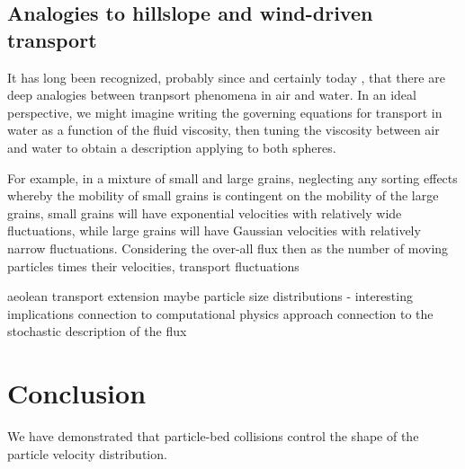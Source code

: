\subsection{Analogies to hillslope and wind-driven transport}

It has long been recognized, probably since \citet{Bagnold1941} and certainly today \citep{}, that there are deep analogies between tranpsort phenomena in air and water.
In an ideal perspective, we might imagine writing the governing equations for transport in water as a function of the fluid viscosity, then tuning the viscosity between air and water to obtain a description applying to both spheres.


For example, in a mixture of small and large grains, neglecting any sorting effects whereby the mobility of small grains is contingent on the mobility of the large grains, small grains will have exponential velocities with relatively wide fluctuations, while large grains will have Gaussian velocities with relatively narrow fluctuations. Considering the over-all flux then as the number of moving particles times their velocities, transport fluctuations



aeolean transport extension maybe
particle size distributions - interesting implications
connection to computational physics approach
connection to the stochastic description of the flux





\section{Conclusion}
We have demonstrated that particle-bed collisions control the shape of the particle velocity distribution.  
\label{sec:conclusion}
